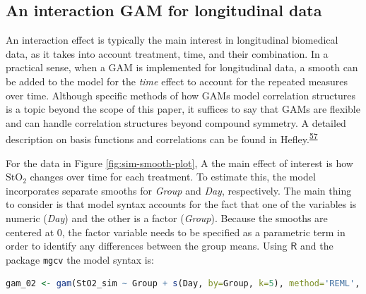 \documentclass[
]{article}
\newcommand{\passthrough}[1]{#1}
\begin{document}
\hypertarget{an-interaction-gam-for-longitudinal-data}{%
\subsection{An interaction GAM for longitudinal data}\label{an-interaction-gam-for-longitudinal-data}}

An interaction effect is typically the main interest in longitudinal biomedical data, as it takes into account treatment, time, and their combination. In a practical sense, when a GAM is implemented for longitudinal data, a smooth can be added to the model for the \emph{time} effect to account for the repeated measures over time. Although specific methods of how GAMs model correlation structures is a topic beyond the scope of this paper, it suffices to say that GAMs are flexible and can handle correlation structures beyond compound symmetry. A detailed description on basis functions and correlations can be found in Hefley.\textsuperscript{\protect\hyperlink{ref-hefley2017}{57}}

For the data in Figure \ref{fig:sim-smooth-plot}, A the main effect of interest is how \(\mbox{StO}_2\) changes over time for each treatment. To estimate this, the model incorporates separate smooths for \emph{Group} and \emph{Day}, respectively. The main thing to consider is that model syntax accounts for the fact that one of the variables is numeric (\emph{Day}) and the other is a factor (\emph{Group}). Because the smooths are centered at 0, the factor variable needs to be specified as a parametric term in order to identify any differences between the group means. Using \(\textsf{R}\) and the package \passthrough{\lstinline!mgcv!} the model syntax is:

\begin{lstlisting}[language=R]
gam_02 <- gam(StO2_sim ~ Group + s(Day, by=Group, k=5), method='REML', data = dat_sim)
\end{lstlisting}
\end{document}
